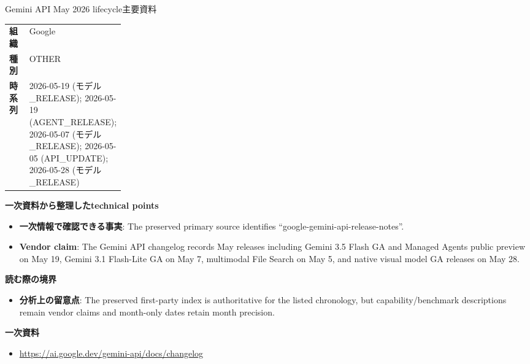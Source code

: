 \begin{technicalnote}{Gemini API May 2026 lifecycle}{主要資料}
\begin{tabularx}{\linewidth}{@{}>{\bfseries}p{0.22\linewidth}X@{}}
組織 & Google \\
種別 & OTHER \\
時系列 & 2026-05-19 (モデル\_RELEASE); 2026-05-19 (AGENT\_RELEASE); 2026-05-07 (モデル\_RELEASE); 2026-05-05 (API\_UPDATE); 2026-05-28 (モデル\_RELEASE) \\
\end{tabularx}
\smallskip
{\bfseries 一次資料から整理したtechnical points}
\begin{itemize}[leftmargin=1.5em,itemsep=0.35em]
\item \textbf{一次情報で確認できる事実}: The preserved primary source identifies “google-gemini-api-release-notes”.
\item \textbf{Vendor claim}: The Gemini API changelog records May releases including Gemini 3.5 Flash GA and Managed Agents public preview on May 19, Gemini 3.1 Flash-Lite GA on May 7, multimodal File Search on May 5, and native visual model GA releases on May 28.
\end{itemize}
{\bfseries 読む際の境界}
\begin{itemize}[leftmargin=1.5em,itemsep=0.35em]
\item \textbf{分析上の留意点}: The preserved first-party index is authoritative for the listed chronology, but capability/benchmark descriptions remain vendor claims and month-only dates retain month precision.
\end{itemize}
{\bfseries 一次資料}
\begingroup\sloppy
\begin{itemize}[leftmargin=1.5em,itemsep=0.25em]
\item {\scriptsize\url{https://ai.google.dev/gemini-api/docs/changelog}}
\end{itemize}
\endgroup
\end{technicalnote}
\medskip

